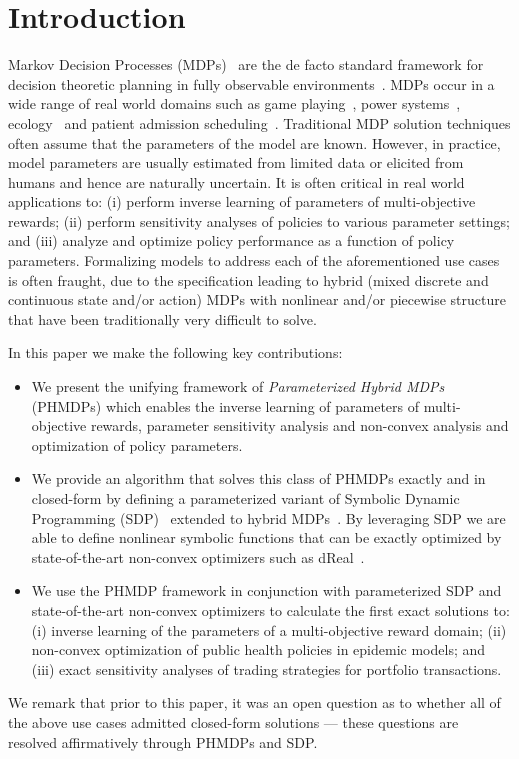 \section{Introduction}
\label{sec:introduction}

Markov Decision Processes (MDPs)~\parencite{Howard_MIT_1960} are the de facto standard framework for decision theoretic planning in fully observable environments~\parencite{Boutilier_JAIR_1999}. MDPs occur in a wide range of real world domains such as game playing~\parencite{Szita_RL_2012}, power systems~\parencite{Reddy_IJCAI_2011}, ecology~\parencite{Williams_EM_2009} and patient admission scheduling~\parencite{Zhu_AIM_2014}. Traditional MDP solution techniques often assume that the parameters of the model are known. However, in practice, model parameters are usually estimated from limited data or elicited from humans and hence are naturally uncertain. It is often critical in real world applications to: (i) perform inverse learning of parameters of multi-objective rewards; (ii) perform sensitivity analyses of policies to various parameter settings; and (iii) analyze and optimize policy performance as a function of policy parameters.  Formalizing models to address each of the aforementioned use cases is often fraught, due to the specification leading to hybrid (mixed discrete and continuous state and/or action) MDPs with nonlinear and/or piecewise structure that have been traditionally very difficult to solve.

In this paper we make the following key contributions:
\begin{itemize}
\item We present the unifying framework of {\it Parameterized Hybrid MDPs} (PHMDPs) which enables the inverse learning of parameters of multi-objective rewards, parameter sensitivity analysis and non-convex analysis and optimization of policy parameters.

\item We provide an algorithm that solves this class of PHMDPs exactly and in closed-form by defining a parameterized variant of Symbolic Dynamic Programming (SDP)~\parencite{Boutilier_IJCAI_2001} extended to hybrid MDPs~\parencite{Sanner_UAI_2011}. By leveraging SDP we are able to define nonlinear symbolic functions that can be exactly optimized by state-of-the-art non-convex optimizers such as dReal~\parencite{Gao2013}.

\item We use the PHMDP framework in conjunction with parameterized SDP and state-of-the-art non-convex optimizers to calculate the first exact solutions to: (i) inverse learning of the parameters of a multi-objective reward domain; (ii) non-convex optimization of public health policies in epidemic models; and (iii) exact sensitivity analyses of trading strategies for portfolio transactions. 
\end{itemize}

We remark that prior to this paper, it was an open question as to whether all of the above use cases admitted closed-form solutions --- these questions are resolved affirmatively through PHMDPs and SDP.